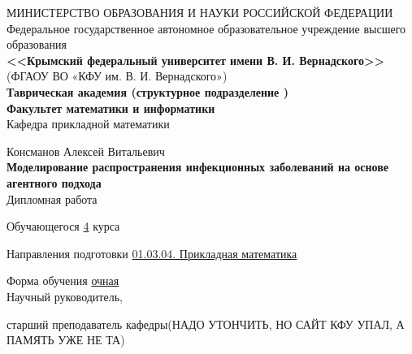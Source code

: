     \begin{titlepage}
    \newpage
	\pagestyle{empty} %
    \begin{center}
    
	
	{\fontsize{13}{15.6}\selectfont МИНИСТЕРСТВО ОБРАЗОВАНИЯ И НАУКИ РОССИЙСКОЙ ФЕДЕРАЦИИ}\\ 
    \normalsize  {Федеральное государственное автономное образовательное учреждение высшего образования} \\
    
    \large \textbf{<<Крымский  федеральный  университет имени В. И. Вернадского>>} \\  \vspace{2mm}
    (ФГАОУ ВО «КФУ им. В. И. Вернадского»)\\
    
    \textbf{Таврическая академия (структурное подразделение ) \\
    \vspace{2mm}
    Факультет математики и информатики} \\
    \vspace{2mm}
    Кафедра прикладной математики 
    \end{center}
    \vspace{1em}

    \begin{center}
	\normalsize Консманов Алексей Витальевич \\
    \LARGE \textbf{Моделирование распространения инфекционных заболеваний на основе агентного подхода} \\
    \vspace{1em}
    \normalsize Дипломная работа 
    \end{center}

    \vspace{1em}
    Обучающегося \hspace*{3cm} \underline{4} курса 
    
    
    Направления подготовки\hspace*{8mm} \underline{01.03.04. Прикладная математика}
    
        
    Форма обучения\hspace*{2.75cm} \underline{очная}\\
    
    
    Научный руководитель,
    
    старший преподаватель кафедры(НАДО  УТОНЧИТЬ, НО САЙТ КФУ УПАЛ, А ПАМЯТЬ УЖЕ НЕ ТА) 
    

\end{titlepage}
